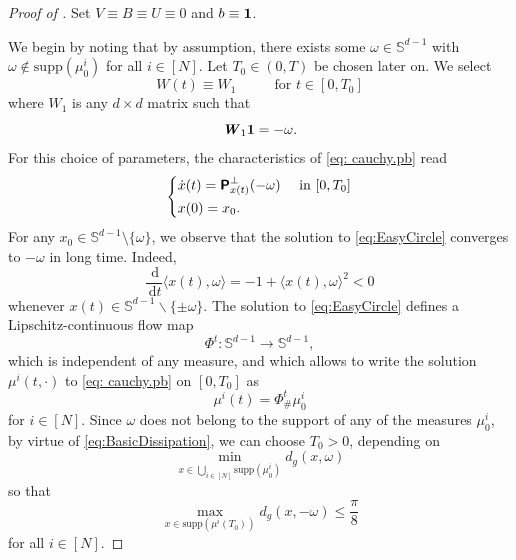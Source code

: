\documentclass[a4paper,11pt]{article}
\theoremstyle{plain}
\newcommand{\supp}{\mathrm{supp}}
\newcommand{\proj}{\bm{\mathsf{P}}^\perp}
\newcommand{\diff}{\, \mathrm{d}}
\renewcommand{\S}{\mathbb{S}^{d-1}}
\newcommand{\bW}{\bm{\mathit{W}}}
\newcommand{\bV}{\bm{\mathit{V}}}
\newcommand{\bB}{\bm{\mathit{B}}}
\newcommand{\bU}{\bm{\mathit{U}}}
\renewcommand{\leq}{\leqslant}
\numberwithin{equation}{section}
\begin{document}
\begin{proof}[Proof of ]

Set $\bV\equiv \bB\equiv \bU\equiv 0$ and $b\equiv{\bf 1}$.

We begin by noting that by assumption, there exists some $\omega\in\S$ with $\omega\notin\mathrm{supp}(\mu_0^i)$ for all $i\in[N]$.
Let $T_0\in(0,T)$ be chosen later on. We select 
\begin{equation*}
    \bW(t)\equiv \bW_1 \hspace{1cm} \text{ for } t\in[0, T_0]
\end{equation*}
where $\bW_1$ is any $d\times d$ matrix such that
\begin{equation*}
\bW_1 {\bf 1}=-\omega.
\end{equation*}
For this choice of parameters, the characteristics of \eqref{eq: cauchy.pb} read
\begin{equation}\label{eq:EasyCircle}
\begin{dcases}
\dot{x}(t)=\proj_{x(t)}(-\omega) &\text{ in }[0, T_0]\\
x(0)=x_0.
\end{dcases}
\end{equation}
For any $x_0\in\S\setminus\{\omega\}$, we observe that the solution to \eqref{eq:EasyCircle} converges to $-\omega$ in long time. Indeed,
\begin{equation}\label{eq:BasicDissipation}
    \frac{\diff}{\diff t}\langle x(t), \omega\rangle=-1+\langle x(t),\omega \rangle^2<0 
\end{equation}
whenever $x(t)\in\S\backslash\{\pm\omega\}$. The solution to \eqref{eq:EasyCircle} defines a Lipschitz-continuous flow map 
$$\Phi^t\colon\S\to\S,$$ 
which is independent of any measure, and which allows to write the solution $\mu^i(t,\cdot)$ to \eqref{eq: cauchy.pb} on $[0, T_0]$ as
\begin{equation*}
    \mu^i(t)=\Phi^t_\#\mu_{0}^i
\end{equation*} 
for $i\in[N]$. Since $\omega$ does not belong to the support of any of the measures $\mu_0^i$, by virtue of \eqref{eq:BasicDissipation}, we can choose $T_0>0$, depending on
\begin{equation*}
    \min_{x\in \bigcup_{i\in[N]}\supp(\mu_0^i)}d_g(x,\omega)
\end{equation*}
so that
\begin{equation*} 
    \max_{x\in \supp(\mu^i(T_0))}d_g(x,-\omega)\leq \frac\pi8
\end{equation*}
for all $i\in[N]$.


\end{proof}
\end{document}

